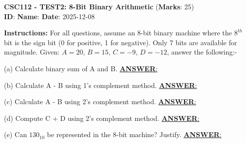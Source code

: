 \documentclass[12pt]{article}
\begin{document}
\begin{center}
\large\textbf{CSC112 - TEST2: 8-Bit Binary Arithmetic} (\textbf{Marks}: 25) \\
 \textbf{ID}: \underline{\hspace{3cm}} \textbf{Name}: \underline{\hspace{8cm}} \quad  \textbf{Date}: 2025-12-08  
\end{center}

\textbf{Instructions:} For all questions, assume an 8-bit binary machine where the $8^{th}$ bit is the sign bit (0 for positive, 1 for negative). Only 7 bits are available for magnitude. Given: $A = 20$, $B = 15$, $C = -9$, $D = -12$, answer the following:-

\begin{tcolorbox}
(a) Calculate binary sum of A and B. \hfill  \uline{\textbf{ANSWER}: \hspace{0.2\textwidth}}

\vspace{4cm}

\end{tcolorbox}
\begin{tcolorbox}
(b) Calculate A - B using 1's complement method.  \hfill  \uline{\textbf{ANSWER}: \hspace{0.2\textwidth}}

\vspace{4cm}

\end{tcolorbox}
\begin{tcolorbox}
(c) Calculate A - B using 2's complement method. \hfill  \uline{\textbf{ANSWER}: \hspace{0.2\textwidth}}

\vspace{4cm}

\end{tcolorbox}
\begin{tcolorbox}
(d) Compute C + D using 2's complement method. \hfill  \uline{\textbf{ANSWER}: \hspace{0.2\textwidth}}

\vspace{4cm}

\end{tcolorbox}
\begin{tcolorbox}
(e) Can $130_{10}$ be represented in the 8-bit machine? Justify. \hfill \uline{\textbf{ANSWER}: \hspace{0.2\textwidth}}

\vspace{4cm}

\end{tcolorbox}
\end{document}
